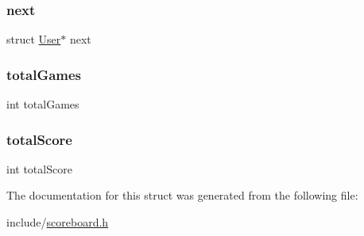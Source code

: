 \subsubsection{\texorpdfstring{next}{next}}
{\footnotesize\ttfamily struct \hyperlink{struct_user}{User}$\ast$ next}

\mbox{\label{struct_user_a184559da2c495bb82ca10df571e6e1ea}} 
\subsubsection{\texorpdfstring{total\+Games}{totalGames}}
{\footnotesize\ttfamily int total\+Games}

\mbox{\label{struct_user_ac7bd3550862b8c18bdd986250e1e89e9}} 
\subsubsection{\texorpdfstring{total\+Score}{totalScore}}
{\footnotesize\ttfamily int total\+Score}



The documentation for this struct was generated from the following file\+:\begin{DoxyCompactItemize}
\item 
include/\hyperlink{scoreboard_8h}{scoreboard.\+h}\end{DoxyCompactItemize}
